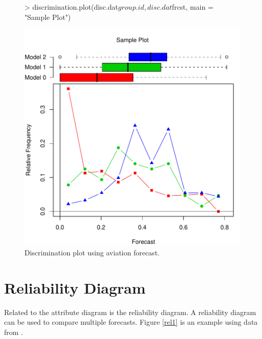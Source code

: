 \documentclass{article}
\begin{document}
\begin {center}
\begin{figure}[H]
\begin{Schunk}
\begin{Sinput}
> discrimination.plot(disc.dat$group.id, disc.dat$frcst, main = "Sample Plot")
\end{Sinput}
\end{Schunk}
\includegraphics{verification-008}
\caption{\label{disc1} Discrimination plot using aviation forecast. }
\end{figure}
\end{center}    

\section{Reliability Diagram}
Related to the attribute diagram is the reliability diagram. A
reliability diagram can be used to compare multiple forecasts.  Figure
\ref{rel1} is an example using data from \cite{wilks95}.
\end{document}
